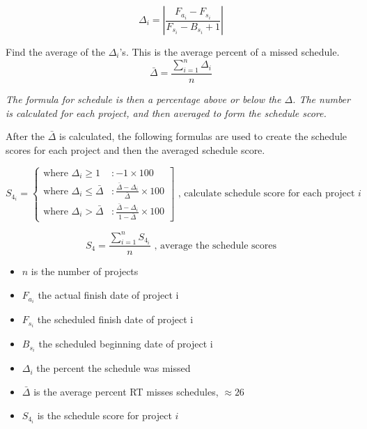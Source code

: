 \documentclass[SDSUThesis.tex]{subfiles}
\begin{document}
        \begin{displaymath}
            \Delta_i = \left| \frac{F_{a_i} - F_{s_i}}{ F_{s_i} - B_{s_i} + 1} \right|
        \end{displaymath}
        
        Find the average of the $\Delta_i$'s.  This is the average percent of a missed
        schedule.  
        \begin{displaymath}
           \bar{\Delta}  = \frac{\sum^n_{i=1}\Delta_i}{n}
        \end{displaymath}
        
        \textit{The formula for schedule is then a percentage above or below the $\Delta$.  
        The number is calculated for each project, and then averaged to form the schedule score.}
        
        After the $\bar{\Delta}$ is calculated, the following formulas are used to create the schedule scores
        for each project and then the averaged schedule score.
    
        \begin{displaymath}
           S_{4_i} = \left\{
             \begin{array}{lr}
                \text{where } \Delta_i \geq 1 & : -1 \times 100 \\
               \text{where }  \Delta_i \leq \bar{\Delta} & : \frac{\bar{\Delta} - \Delta_i}{\bar{\Delta}}   \times 100  \\
               \text{where } \Delta_i > \bar{\Delta} & : \frac{\bar{\Delta} - \Delta_i}{1 - \bar{\Delta}} \times 100
             \end{array}
           \right] \text{   , calculate schedule score for each project $i$}
        \end{displaymath} 

        \[
            S_{4} = \frac{\sum^n_{i=1} S_{4_i}}{n} \text{   , average the schedule scores}
        \]
        \begin{itemize}
            \item $n$ is the number of projects
            \item $F_{a_i}$ the actual finish date of project i
            \item $F_{s_i}$ the scheduled finish date of project i
            \item $B_{s_i}$ the scheduled beginning date of project i
            \item $\Delta_i$ the percent the schedule was missed
            \item $\bar{\Delta}$ is the average percent RT misses schedules, $\approx 26$
            \item $S_{4_i}$ is the schedule score for project $i$
        \end{itemize}
    
\end{document}
